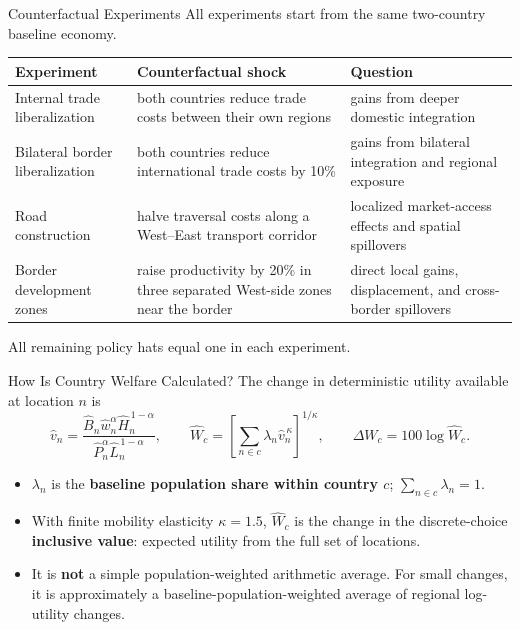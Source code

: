 \documentclass[aspectratio=169,11pt]{beamer}
\newcommand{\B}[1]{\textcolor{blue1}{\textbf{#1}}}
\begin{document}
\begin{frame}{Counterfactual Experiments}
  \footnotesize
  All experiments start from the same two-country baseline economy.

  \renewcommand{\arraystretch}{1.14}
  \begin{center}
  \begin{tabular}{
    >{\raggedright\arraybackslash}p{}
    >{\raggedright\arraybackslash}p{}
    >{\raggedright\arraybackslash}p{}}
    \toprule
    Experiment & Counterfactual shock & Question \\
    \midrule
    Internal trade liberalization
      & both countries reduce trade costs between their own regions
      & gains from deeper domestic integration \\
    Bilateral border liberalization
      & both countries reduce international trade costs by 10\%
      & gains from bilateral integration and regional exposure \\
    Road construction
      & halve traversal costs along a West--East transport corridor
      & localized market-access effects and spatial spillovers \\
    Border development zones
      & raise productivity by 20\% in three separated West-side zones near the border
      & direct local gains, displacement, and cross-border spillovers \\
    \bottomrule
  \end{tabular}
  \end{center}

  \vfill
  All remaining policy hats equal one in each experiment.
\end{frame}

\begin{frame}{How Is Country Welfare Calculated?}
  \small
  The change in deterministic utility available at location \(n\) is
  \[
    \widehat v_n
      =
      \frac{\widehat B_n\widehat w_n^\alpha
      \widehat H_n^{\,1-\alpha}}
      {\widehat P_n^\alpha\widehat L_n^{\,1-\alpha}},
    \qquad
    \widehat W_c
      =
      \left[
      \sum_{n\in c}\lambda_n
      \widehat v_n^{\,\kappa}
      \right]^{1/\kappa},
    \qquad
    \Delta W_c=100\log\widehat W_c .
  \]
  \begin{itemize}\setlength{\itemsep}{5pt}
    \item \(\lambda_n\) is the \B{baseline population share within country \(c\)};
      \(\sum_{n\in c}\lambda_n=1\).
    \item With finite mobility elasticity \(\kappa=1.5\), \(\widehat W_c\) is
      the change in the discrete-choice \B{inclusive value}: expected utility
      from the full set of locations.
    \item It is \B{not} a simple population-weighted arithmetic average.
      For small changes, it is approximately a baseline-population-weighted
      average of regional log-utility changes.
  \end{itemize}
\end{frame}
\end{document}
